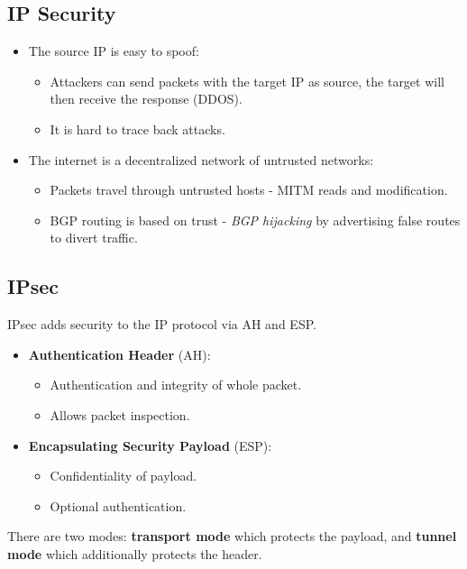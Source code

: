 \documentclass[11pt]{article}
\begin{document}
\subsection{IP Security}
\begin{itemize}
  \item The source IP is easy to spoof:
    \begin{itemize}
      \item Attackers can send packets with the target IP as source, the target will then receive the response (DDOS).
      \item It is hard to trace back attacks.
    \end{itemize}
  \item The internet is a decentralized network of untrusted networks:
    \begin{itemize}
      \item Packets travel through untrusted hosts - MITM reads and modification.
      \item BGP routing is based on trust - \textit{BGP hijacking} by advertising false routes to divert traffic.
    \end{itemize}
\end{itemize}

\subsection{IPsec}
IPsec adds security to the IP protocol via AH and ESP.

\begin{itemize}
  \item \textbf{Authentication Header} (AH):
    \begin{itemize}
      \item Authentication and integrity of whole packet.
      \item Allows packet inspection.
    \end{itemize}
  \item \textbf{Encapsulating Security Payload} (ESP):
    \begin{itemize}
      \item Confidentiality of payload.
      \item Optional authentication.
    \end{itemize}
\end{itemize}

There are two modes: \textbf{transport mode} which protects the payload, and \textbf{tunnel mode} which additionally protects the header.
\end{document}
